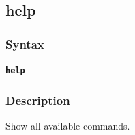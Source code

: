\pagebreak
\subsection*{help}
\subsubsection*{Syntax}
\texttt{\textbf{help}}\newline
\subsubsection*{Description}
Show all available commands.